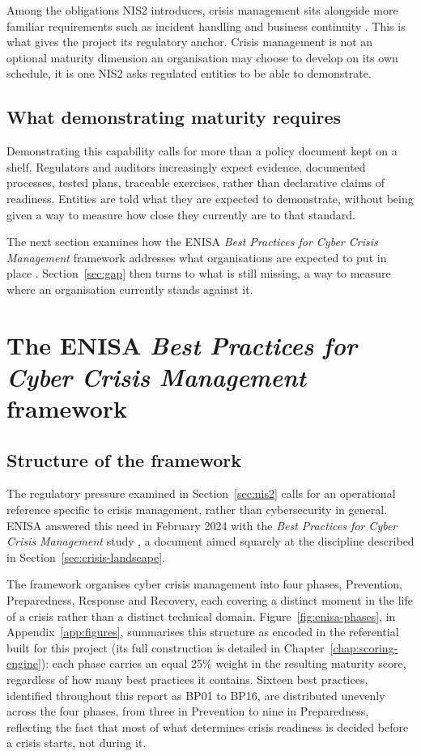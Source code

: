 Among the obligations NIS2 introduces, crisis management sits alongside more
familiar requirements such as incident handling and business continuity
\cite{nis2_directive_2022}.
This is what gives the project its regulatory anchor. Crisis management is
not an optional maturity dimension an organisation may choose to develop on
its own schedule, it is one NIS2 asks regulated entities to be able to
demonstrate.

\subsection{What demonstrating maturity requires}

Demonstrating this capability calls for more than a policy document kept on
a shelf. Regulators and auditors increasingly expect evidence, documented
processes, tested plans, traceable exercises, rather than declarative
claims of readiness. Entities are told what they are expected to
demonstrate, without being given a way to measure how close they currently
are to that standard.

The next section examines how the ENISA \emph{Best Practices for Cyber
Crisis Management} framework addresses what organisations are expected to
put in place \cite{enisa_crisis_mgmt_2024}. Section~\ref{sec:gap} then turns
to what is still missing, a way to measure where an organisation currently
stands against it.

\section{The ENISA \emph{Best Practices for Cyber Crisis Management} framework}
\label{sec:enisa-framework}

\subsection{Structure of the framework}

The regulatory pressure examined in Section~\ref{sec:nis2} calls for an operational
reference specific to crisis management, rather than cybersecurity in
general. ENISA answered this need in February 2024 with the \emph{Best
Practices for Cyber Crisis Management} study \cite{enisa_crisis_mgmt_2024},
a document aimed squarely at the discipline described in
Section~\ref{sec:crisis-landscape}.

The framework organises cyber crisis management into four phases,
Prevention, Preparedness, Response and Recovery, each covering a distinct
moment in the life of a crisis rather than a distinct technical domain.
Figure~\ref{fig:enisa-phases}, in Appendix~\ref{app:figures}, summarises this structure as encoded in the
referential built for this project (its full construction is detailed in
Chapter~\ref{chap:scoring-engine}): each phase carries an equal 25\% weight in the
resulting maturity score, regardless of how many best practices it
contains. Sixteen best practices, identified throughout this report as BP01 to
BP16, are distributed unevenly across the four phases, from three in Prevention
to nine in Preparedness, reflecting the
fact that most of what determines crisis readiness is decided before a
crisis starts, not during it.

